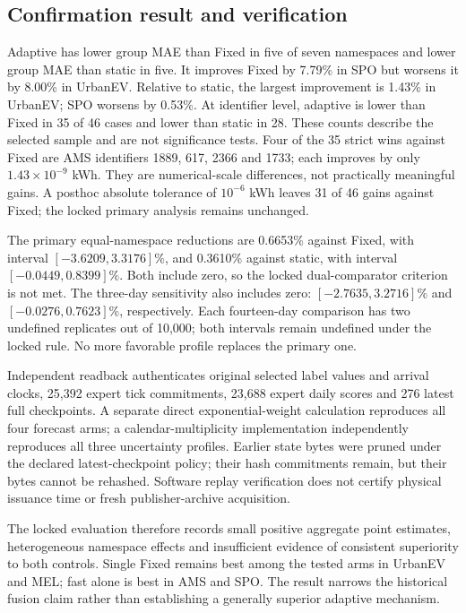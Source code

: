 \documentclass[pdflatex,iicol,sn-mathphys-num]{sn-jnl}
\begin{document}
\subsection{Confirmation result and verification}
Adaptive has lower group MAE than Fixed in five of seven namespaces and lower group MAE than static in five. It improves Fixed by 7.79\% in SPO but worsens it by 8.00\% in UrbanEV. Relative to static, the largest improvement is 1.43\% in UrbanEV; SPO worsens by 0.53\%. At identifier level, adaptive is lower than Fixed in 35 of 46 cases and lower than static in 28. These counts describe the selected sample and are not significance tests. Four of the 35 strict wins against Fixed are AMS identifiers 1889, 617, 2366 and 1733; each improves by only $1.43\times10^{-9}$ kWh. They are numerical-scale differences, not practically meaningful gains. A posthoc absolute tolerance of $10^{-6}$ kWh leaves 31 of 46 gains against Fixed; the locked primary analysis remains unchanged.

The primary equal-namespace reductions are 0.6653\% against Fixed, with interval $[-3.6209,3.3176]\%$, and 0.3610\% against static, with interval $[-0.0449,0.8399]\%$. Both include zero, so the locked dual-comparator criterion is not met. The three-day sensitivity also includes zero: $[-2.7635,3.2716]\%$ and $[-0.0276,0.7623]\%$, respectively. Each fourteen-day comparison has two undefined replicates out of 10,000; both intervals remain undefined under the locked rule. No more favorable profile replaces the primary one.

Independent readback authenticates original selected label values and arrival clocks, 25,392 expert tick commitments, 23,688 expert daily scores and 276 latest full checkpoints. A separate direct exponential-weight calculation reproduces all four forecast arms; a calendar-multiplicity implementation independently reproduces all three uncertainty profiles. Earlier state bytes were pruned under the declared latest-checkpoint policy; their hash commitments remain, but their bytes cannot be rehashed. Software replay verification does not certify physical issuance time or fresh publisher-archive acquisition.

The locked evaluation therefore records small positive aggregate point estimates, heterogeneous namespace effects and insufficient evidence of consistent superiority to both controls. Single Fixed remains best among the tested arms in UrbanEV and MEL; fast alone is best in AMS and SPO. The result narrows the historical fusion claim rather than establishing a generally superior adaptive mechanism.
\end{document}
